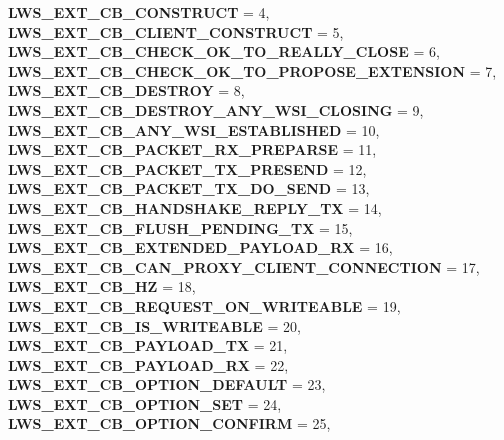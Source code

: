 \begin{DoxyCompactItemize}
{\bfseries L\+W\+S\+\_\+\+E\+X\+T\+\_\+\+C\+B\+\_\+\+C\+O\+N\+S\+T\+R\+U\+CT} = 4, 
{\bfseries L\+W\+S\+\_\+\+E\+X\+T\+\_\+\+C\+B\+\_\+\+C\+L\+I\+E\+N\+T\+\_\+\+C\+O\+N\+S\+T\+R\+U\+CT} = 5, 
\newline
{\bfseries L\+W\+S\+\_\+\+E\+X\+T\+\_\+\+C\+B\+\_\+\+C\+H\+E\+C\+K\+\_\+\+O\+K\+\_\+\+T\+O\+\_\+\+R\+E\+A\+L\+L\+Y\+\_\+\+C\+L\+O\+SE} = 6, 
{\bfseries L\+W\+S\+\_\+\+E\+X\+T\+\_\+\+C\+B\+\_\+\+C\+H\+E\+C\+K\+\_\+\+O\+K\+\_\+\+T\+O\+\_\+\+P\+R\+O\+P\+O\+S\+E\+\_\+\+E\+X\+T\+E\+N\+S\+I\+ON} = 7, 
{\bfseries L\+W\+S\+\_\+\+E\+X\+T\+\_\+\+C\+B\+\_\+\+D\+E\+S\+T\+R\+OY} = 8, 
{\bfseries L\+W\+S\+\_\+\+E\+X\+T\+\_\+\+C\+B\+\_\+\+D\+E\+S\+T\+R\+O\+Y\+\_\+\+A\+N\+Y\+\_\+\+W\+S\+I\+\_\+\+C\+L\+O\+S\+I\+NG} = 9, 
\newline
{\bfseries L\+W\+S\+\_\+\+E\+X\+T\+\_\+\+C\+B\+\_\+\+A\+N\+Y\+\_\+\+W\+S\+I\+\_\+\+E\+S\+T\+A\+B\+L\+I\+S\+H\+ED} = 10, 
{\bfseries L\+W\+S\+\_\+\+E\+X\+T\+\_\+\+C\+B\+\_\+\+P\+A\+C\+K\+E\+T\+\_\+\+R\+X\+\_\+\+P\+R\+E\+P\+A\+R\+SE} = 11, 
{\bfseries L\+W\+S\+\_\+\+E\+X\+T\+\_\+\+C\+B\+\_\+\+P\+A\+C\+K\+E\+T\+\_\+\+T\+X\+\_\+\+P\+R\+E\+S\+E\+ND} = 12, 
{\bfseries L\+W\+S\+\_\+\+E\+X\+T\+\_\+\+C\+B\+\_\+\+P\+A\+C\+K\+E\+T\+\_\+\+T\+X\+\_\+\+D\+O\+\_\+\+S\+E\+ND} = 13, 
\newline
{\bfseries L\+W\+S\+\_\+\+E\+X\+T\+\_\+\+C\+B\+\_\+\+H\+A\+N\+D\+S\+H\+A\+K\+E\+\_\+\+R\+E\+P\+L\+Y\+\_\+\+TX} = 14, 
{\bfseries L\+W\+S\+\_\+\+E\+X\+T\+\_\+\+C\+B\+\_\+\+F\+L\+U\+S\+H\+\_\+\+P\+E\+N\+D\+I\+N\+G\+\_\+\+TX} = 15, 
{\bfseries L\+W\+S\+\_\+\+E\+X\+T\+\_\+\+C\+B\+\_\+\+E\+X\+T\+E\+N\+D\+E\+D\+\_\+\+P\+A\+Y\+L\+O\+A\+D\+\_\+\+RX} = 16, 
{\bfseries L\+W\+S\+\_\+\+E\+X\+T\+\_\+\+C\+B\+\_\+\+C\+A\+N\+\_\+\+P\+R\+O\+X\+Y\+\_\+\+C\+L\+I\+E\+N\+T\+\_\+\+C\+O\+N\+N\+E\+C\+T\+I\+ON} = 17, 
\newline
{\bfseries L\+W\+S\+\_\+\+E\+X\+T\+\_\+\+C\+B\+\_\+HZ} = 18, 
{\bfseries L\+W\+S\+\_\+\+E\+X\+T\+\_\+\+C\+B\+\_\+\+R\+E\+Q\+U\+E\+S\+T\+\_\+\+O\+N\+\_\+\+W\+R\+I\+T\+E\+A\+B\+LE} = 19, 
{\bfseries L\+W\+S\+\_\+\+E\+X\+T\+\_\+\+C\+B\+\_\+\+I\+S\+\_\+\+W\+R\+I\+T\+E\+A\+B\+LE} = 20, 
{\bfseries L\+W\+S\+\_\+\+E\+X\+T\+\_\+\+C\+B\+\_\+\+P\+A\+Y\+L\+O\+A\+D\+\_\+\+TX} = 21, 
\newline
{\bfseries L\+W\+S\+\_\+\+E\+X\+T\+\_\+\+C\+B\+\_\+\+P\+A\+Y\+L\+O\+A\+D\+\_\+\+RX} = 22, 
{\bfseries L\+W\+S\+\_\+\+E\+X\+T\+\_\+\+C\+B\+\_\+\+O\+P\+T\+I\+O\+N\+\_\+\+D\+E\+F\+A\+U\+LT} = 23, 
{\bfseries L\+W\+S\+\_\+\+E\+X\+T\+\_\+\+C\+B\+\_\+\+O\+P\+T\+I\+O\+N\+\_\+\+S\+ET} = 24, 
{\bfseries L\+W\+S\+\_\+\+E\+X\+T\+\_\+\+C\+B\+\_\+\+O\+P\+T\+I\+O\+N\+\_\+\+C\+O\+N\+F\+I\+RM} = 25, 

\end{DoxyCompactItemize}
